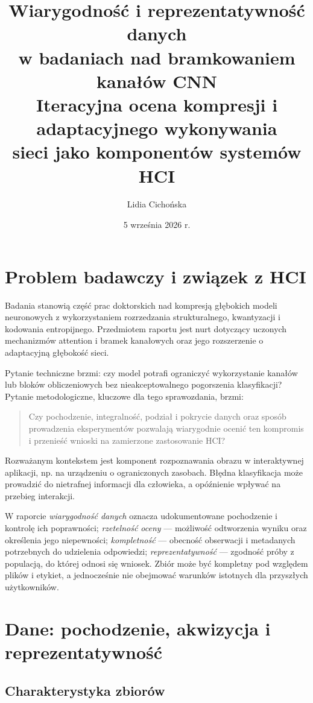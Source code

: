 \documentclass[12pt,a4paper]{article}
\title{Wiarygodność i reprezentatywność danych\\
w badaniach nad bramkowaniem kanałów CNN\\[0.5em]
\large Iteracyjna ocena kompresji i adaptacyjnego wykonywania\\
sieci jako komponentów systemów HCI}
\author{Lidia Cichońska}
\date{5 września 2026 r.}
\begin{document}
\maketitle


\section{Problem badawczy i związek z HCI}

Badania stanowią część prac doktorskich nad kompresją głębokich modeli
neuronowych z wykorzystaniem rozrzedzania strukturalnego, kwantyzacji
i kodowania entropijnego. Przedmiotem raportu jest nurt dotyczący
uczonych mechanizmów attention i bramek kanałowych oraz jego rozszerzenie
o adaptacyjną głębokość sieci. 

Pytanie techniczne brzmi: czy model potrafi ograniczyć wykorzystanie kanałów
lub bloków obliczeniowych bez nieakceptowalnego pogorszenia klasyfikacji?
Pytanie metodologiczne, kluczowe dla tego sprawozdania, brzmi:
\begin{quote}
Czy pochodzenie, integralność, podział i pokrycie danych oraz sposób
prowadzenia eksperymentów pozwalają wiarygodnie ocenić ten kompromis
i przenieść wnioski na zamierzone zastosowanie HCI?
\end{quote}

Rozważanym kontekstem jest komponent rozpoznawania obrazu w interaktywnej
aplikacji, np. na urządzeniu o ograniczonych zasobach. Błędna klasyfikacja
może prowadzić do nietrafnej informacji dla człowieka, a opóźnienie wpływać
na przebieg interakcji. 

W raporcie \emph{wiarygodność danych} oznacza udokumentowane pochodzenie
i kontrolę ich poprawności; \emph{rzetelność oceny} --- możliwość odtworzenia
wyniku oraz określenia jego niepewności; \emph{kompletność} --- obecność
obserwacji i metadanych potrzebnych do udzielenia odpowiedzi;
\emph{reprezentatywność} --- zgodność próby z populacją, do której odnosi
się wniosek. Zbiór może być kompletny pod względem plików i etykiet,
a jednocześnie nie obejmować warunków istotnych dla przyszłych użytkowników.

\section{Dane: pochodzenie, akwizycja i reprezentatywność}

\subsection{Charakterystyka zbiorów}
\end{document}
